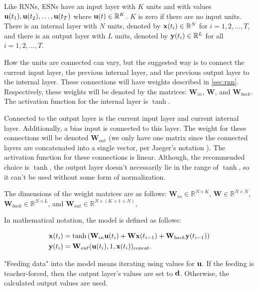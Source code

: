 \documentclass{article}
\begin{document}
Like RNNs, ESNs have an input layer with $K$ units and with values $\mathbf{u}(t_1),
\mathbf{u}(t_2), \dots, \mathbf{u}(t_T)$ where $\mathbf{u}(t) \in \mathbb{R}^K$. $K$ is zero if
there are no input units. There is an internal layer with $N$ units, denoted
by $\mathbf{x}(t_i) \in \mathbb{R}^N$ for $i = 1, 2, \dots, T$, and there is an
output layer with $L$ units, denoted by $\mathbf{y}(t_i) \in \mathbb{R}^L$ for all
$i = 1, 2, \dots, T$.

\newcommand{\W}{\mathbf{W}}
\newcommand{\Win}{\mathbf{W}_{in}}
\newcommand{\Wback}{\mathbf{W}_{back}}
\newcommand{\Wout}{\mathbf{W}_{out}}

How the units are connected can vary, but the suggested way
\cite{jaeger2002tutorial} is to connect the current
input layer, the previous internal layer, and the previous output layer to
the internal layer.
These connections will have weights described in \ref{sec:rnn}. Respectively,
these weights will be denoted by the matrices: $\Win$, $\W$, and $\Wback$.
The activation function for the internal layer is $\tanh$.

Connected to the output layer is the current input layer and current internal
layer. Additionally, a bias input is connected to this layer. The weight for
these connections will be denoted $\Wout$ (we only have one matrix since the
connected layers are concatenated into a single vector, per Jaeger's notation
\cite{jaeger2002tutorial}). The activation function for these connections is
linear. Although, the recommended choice is $\tanh$, the output layer doesn't
necessarily lie in the range of $\tanh$, so it can't be used without some
form of normalization.

The dimensions of the weight matrices are as follows:
$\Win \in \mathbb{R}^{N \times K}$,
$\W \in \mathbb{R}^{N \times N}$,
$\Wback \in \mathbb{R}^{N \times L}$, and
$\Wout \in \mathbb{R}^{N \times (K+1+N)}$,

In mathematical notation, the model is defined as follows:

\begin{align}
    \xv(t_{i}) &= \tanh \left(
            \Win \uv(t_i)
            + \W \xv(t_{i-1})
            + \Wback \yv(t_{i-1})
        \right) \\
    \yv(t_i) &= \Wout (\uv(t_i), 1, \xv(t_i))_{\text{concat}}.
\end{align}

"Feeding data" into the model means iterating using values for $\mathbf{u}$. If the 
feeding is teacher-forced, then the output layer's values are set to $\mathbf{d}$. 
Otherwise, the calculated output values are used.
\end{document}
